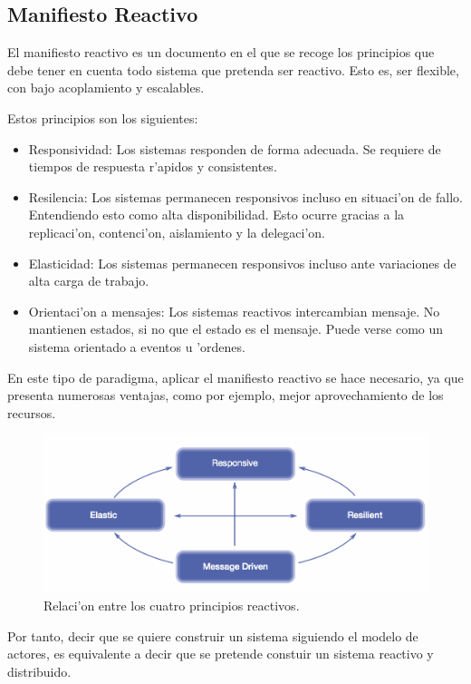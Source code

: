 \documentclass[12pt]{article}
\begin{document}
\subsection{Manifiesto Reactivo}
\label{sub:manifiesto reactivo}
El manifiesto reactivo es un documento en el que se recoge los principios que debe
tener en cuenta todo sistema que pretenda ser reactivo. Esto es, ser flexible, con bajo
acoplamiento y escalables.

Estos principios son los siguientes:

\begin{itemize}
	\item Responsividad: Los sistemas responden de forma adecuada. Se requiere de tiempos
    de respuesta r'apidos y consistentes.
	\item Resilencia: Los sistemas permanecen responsivos incluso en situaci'on de fallo.
    Entendiendo esto como alta disponibilidad. Esto ocurre gracias a la replicaci'on, contenci'on,
    aislamiento y la delegaci'on.
	\item Elasticidad: Los sistemas permanecen responsivos incluso ante variaciones de alta
    carga de trabajo.
	\item Orientaci'on a mensajes: Los sistemas reactivos intercambian mensaje. No mantienen estados,
    si no que el estado es el mensaje. Puede verse como un sistema orientado a eventos u 'ordenes.
\end{itemize}

En este tipo de paradigma, aplicar el manifiesto reactivo se hace necesario, ya que presenta
numerosas ventajas, como por ejemplo, mejor aprovechamiento de los recursos.

\begin{figure}[h]
\centering
\includegraphics[scale=0.3]{reactivo}
\caption{Relaci'on entre los cuatro principios reactivos.}
\end{figure}

Por tanto, decir que se quiere construir un sistema siguiendo el modelo de actores, es equivalente
a decir que se pretende constuir un sistema reactivo y distribuido.
\end{document}
